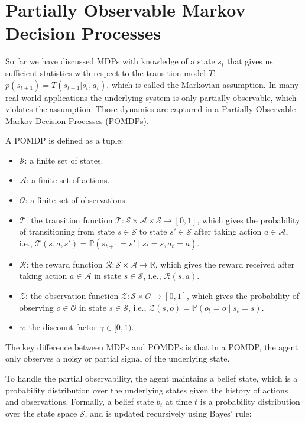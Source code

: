 \section{Partially Observable Markov Decision Processes}
\label{POMDP}
So far we have discussed MDPs with knowledge of a state $s_t$ that gives us sufficient statistics with respect to the 
transition model $T$: $p(s_{t+1}) = T(s_{t+1}|s_t, a_t)$, which is called the Markovian assumption. In many real-world applications the underlying system 
is only partially observable, which violates the assumption. Those dynamics are captured in a Partially Observable Markov Decision Processes (POMDPs).

A POMDP is defined as a tuple:

\begin{itemize}
\item $\mathcal{S}$: a finite set of states.
\item $\mathcal{A}$: a finite set of actions.
\item $\mathcal{O}$: a finite set of observations.
\item $\mathcal{T}$: the transition function $\mathcal{T}: \mathcal{S} \times \mathcal{A} \times \mathcal{S} \rightarrow [0, 1]$, which gives the probability of transitioning from state $s \in \mathcal{S}$ to state $s' \in \mathcal{S}$ after taking action $a \in \mathcal{A}$, i.e., $\mathcal{T}(s, a, s') = \mathbb{P}(s_{t+1} = s' \mid s_t = s, a_t = a)$.
\item $\mathcal{R}$: the reward function $\mathcal{R}: \mathcal{S} \times \mathcal{A} \rightarrow \mathbb{R}$, which gives the reward received after taking action $a \in \mathcal{A}$ in state $s \in \mathcal{S}$, i.e., $\mathcal{R}(s, a)$.
\item $\mathcal{Z}$: the observation function $\mathcal{Z}: \mathcal{S} \times \mathcal{O} \rightarrow [0, 1]$, which gives the probability of observing $o \in \mathcal{O}$ in state $s \in \mathcal{S}$, i.e., $\mathcal{Z}(s, o) = \mathbb{P}(o_{t} = o \mid s_t = s)$.
\item $\gamma$: the discount factor $\gamma \in [0, 1)$.
\end{itemize}

The key difference between MDPs and POMDPs is that in a POMDP, the agent only observes a noisy or partial signal of the underlying state.

To handle the partial observability, the agent maintains a belief state, which is a probability distribution over the underlying states given the history of actions and observations. Formally, a belief state $b_t$ at time $t$ is a probability distribution over the state space $\mathcal{S}$, and is updated recursively using Bayes' rule:

